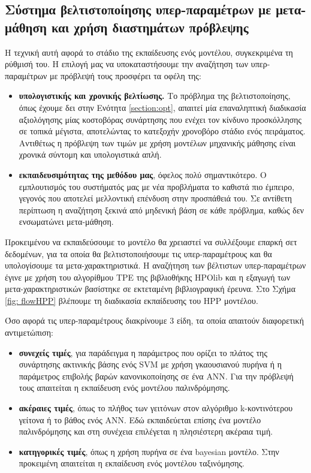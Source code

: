 \subsection{Σύστημα βελτιστοποίησης υπερ-παραμέτρων με μετα-μάθηση και χρήση διαστημάτων πρόβλεψης} \label{sec:HPP}
Η τεχνική αυτή αφορά το στάδιο της εκπαίδευσης ενός μοντέλου, συγκεκριμένα τη ρύθμισή του. Η επιλογή μας να υποκαταστήσουμε την αναζήτηση των υπερ-παραμέτρων με πρόβλεψή τους προσφέρει τα οφέλη της:
\begin{itemize}
	\item \textbf{υπολογιστικής και χρονικής βελτίωσης.} Το πρόβλημα της βελτιστοποίησης, όπως έχουμε δει στην Ενότητα \ref{section:opt}, απαιτεί μία επαναληπτική διαδικασία αξιολόγησης μίας κοστοβόρας συνάρτησης που ενέχει τον κίνδυνο προσκόλλησης σε τοπικά μέγιστα, αποτελώντας το κατεξοχήν χρονοβόρο στάδιο ενός πειράματος. Αντιθέτως η πρόβλεψη των τιμών με χρήση μοντέλων μηχανικής μάθησης είναι χρονικά σύντομη και υπολογιστικά απλή.
	\item \textbf{εκπαιδευσιμότητας της μεθόδου μας}, όφελος πολύ σημαντικότερο. Ο εμπλουτισμός του συστήματός μας με νέα προβλήματα το καθιστά πιο έμπειρο, γεγονός που αποτελεί μελλοντική επένδυση στην προσπάθειά του. Σε αντίθετη περίπτωση η αναζήτηση ξεκινά από μηδενική βάση σε κάθε πρόβλημα, καθώς δεν ενσωματώνει μετα-μάθηση. 
\end{itemize}

Προκειμένου να εκπαιδεύσουμε το μοντέλο θα χρειαστεί να συλλέξουμε επαρκή σετ δεδομένων, για τα οποία θα βελτιστοποιήσουμε τις υπερ-παραμέτρους και θα υπολογίσουμε τα μετα-χαρακτηριστικά. Η αναζήτηση των βέλτιστων υπερ-παραμέτρων έγινε με χρήση του αλγορίθμου TPE της βιβλιοθήκης HPOlib και η εξαγωγή των μετα-χαρακτηριστικών βασίστηκε σε εκτεταμένη βιβλιογραφική έρευνα. Στο Σχήμα \ref{fig: flowHPP} βλέπουμε τη διαδικασία εκπαίδευσης του HPP μοντέλου.

Όσο αφορά τις υπερ-παραμέτρους διακρίνουμε 3 είδη, τα οποία απαιτούν διαφορετική αντιμετώπιση:
\begin{itemize}
	\item \textbf{συνεχείς τιμές}, για παράδειγμα η παράμετρος που ορίζει το πλάτος της συνάρτησης ακτινικής βάσης ενός SVM με χρήση γκαουσιανού πυρήνα ή η παράμετρος επιβολής βαρών κανονικοποίησης σε ένα \gls{ANN}. Για την πρόβλεψή τους απαιτείται η εκπαίδευση ενός μοντέλου παλινδρόμησης.
	\item \textbf{ακέραιες τιμές}, όπως το πλήθος των γειτόνων στον αλγόριθμο k-κοντινότερου γείτονα ή το βάθος ενός \gls{ANN}. Εδώ εκπαιδεύεται επίσης ένα μοντέλο παλινδρόμησης και στη συνέχεια επιλέγεται η πλησιέστερη ακέραια τιμή.
	\item \textbf{κατηγορικές τιμές}, όπως η χρήση πυρήνα σε ένα bayesian μοντέλο. Στην προκειμένη απαιτείται η εκπαίδευση ενός μοντέλου ταξινόμησης.
\end{itemize}



